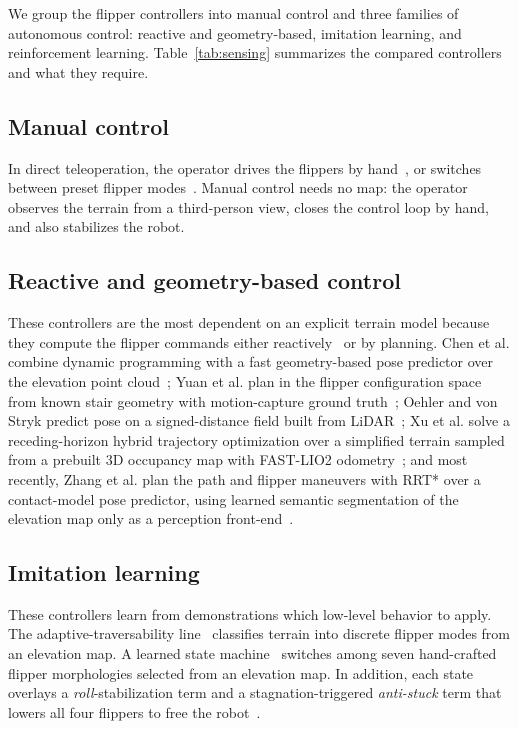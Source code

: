 We group the flipper controllers into manual control and three families of autonomous
control: reactive and geometry-based, imitation learning, and reinforcement learning.
Table~\ref{tab:sensing} summarizes the compared controllers and what they
require.

\subsection{Manual control}
In direct teleoperation, the operator drives the flippers by hand~\cite{cihala2025}, or
switches between preset flipper modes~\cite{larochelle2013,azayev2022}. Manual control
needs no map: the operator observes the terrain from a third-person view, closes the control
loop by hand, and also stabilizes the robot.

\subsection{Reactive and geometry-based control}
These controllers are the most dependent on an explicit terrain model because they compute the flipper commands either
reactively~\cite{cihala2025} or by planning. Chen et al. combine dynamic programming with a
fast geometry-based pose predictor over the elevation
point cloud~\cite{chen2023}; Yuan et al. plan in the flipper configuration space
from known stair geometry with motion-capture ground truth~\cite{yuan2019}; Oehler
and von Stryk predict pose on a signed-distance field built from
LiDAR~\cite{oehler2024}; Xu et al. solve a receding-horizon hybrid trajectory
optimization over a simplified terrain sampled from a prebuilt 3D occupancy map with
FAST-LIO2 odometry~\cite{xu2024}; and most recently, Zhang et al. plan the path and flipper
maneuvers with RRT* over a contact-model pose predictor, using learned semantic
segmentation of the elevation map only as a perception front-end~\cite{zhang2025}.

\subsection{Imitation learning}
These controllers learn from demonstrations which low-level behavior to apply. The
adaptive-traversability line~\cite{zimmermann2014} classifies
terrain into discrete flipper modes from an elevation map. 
A learned state machine~\cite{azayev2022}
switches among seven hand-crafted flipper morphologies selected from an elevation map. In addition, each
state overlays a \emph{roll}-stabilization term and a stagnation-triggered
\emph{anti-stuck} term that lowers all four flippers to free the robot~\cite{azayev2022}.

